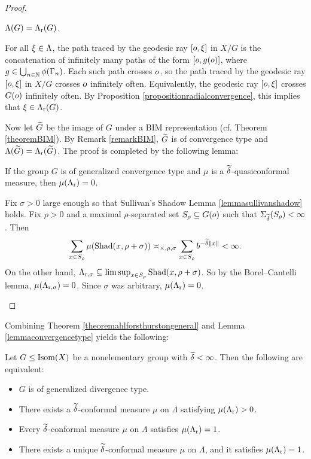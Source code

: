 \begin{proof}
\begin{subproof}
\end{subproof}
\begin{claim}
$\Lambda(G) = \Lambda_{\mathrm r}(G)$.
\end{claim}
\begin{subproof}
For all $\xi\in\Lambda$, the path traced by the geodesic ray $[o,\xi]$ in $X/G$ is the concatenation of infinitely many paths of the form $[o,g(o)]$, where $g\in \bigcup_{n\in\N}\phi(\Gamma_n)$. Each such path crosses $o$, so the path traced by the geodesic ray $[o,\xi]$ in $X/G$ crosses $o$ infinitely often. Equivalently, the geodesic ray $[o,\xi]$ crosses $G(o)$ infinitely often. By Proposition \ref{propositionradialconvergence}, this implies that $\xi\in\Lambda_{\mathrm r}(G)$.
\end{subproof}

Now let $\widetilde G$ be the image of $G$ under a BIM representation (cf. Theorem \ref{theoremBIM}). By Remark \ref{remarkBIM}, $\widetilde G$ is of convergence type and $\Lambda(\widetilde G) = \Lambda_{\mathrm r}(\widetilde G)$. The proof is completed by the following lemma:

\begin{lemma}
\label{lemmaconvergencetype}
If the group $G$ is of generalized convergence type and $\mu$ is a $\widetilde\delta$-quasiconformal measure, then $\mu(\Lambda_{\mathrm r}) = 0$.
\end{lemma}
\begin{subproof}
Fix $\sigma > 0$ large enough so that Sullivan's Shadow Lemma \ref{lemmasullivanshadow} holds. Fix $\rho > 0$ and a maximal $\rho$-separated set $S_\rho\subseteq G(o)$ such that $\Sigma_{\widetilde\delta}(S_\rho) < \infty$. Then
\[
\sum_{x\in S_\rho} \mu(\operatorname{Shad}(x,\rho + \sigma)) \asymp_{\times,\rho,\sigma} \sum_{x\in S_\rho} b^{-\widetilde\delta\|x\|} < \infty.
\]
On the other hand, $\Lambda_{\mathrm r,\sigma}\subseteq\limsup_{x\in S_\rho} \operatorname{Shad}(x,\rho + \sigma)$. So by the Borel--Cantelli lemma, $\mu(\Lambda_{\mathrm r,\sigma}) = 0$. Since $\sigma$ was arbitrary, $\mu(\Lambda_{\mathrm r}) = 0$.
\end{subproof}
\end{proof}


Combining Theorem \ref{theoremahlforsthurstongeneral} and Lemma \ref{lemmaconvergencetype} yields the following:

\begin{proposition}
\label{propositiondivtypedichotomy}
Let $G\leq\operatorname{Isom}(X)$ be a nonelementary group with $\widetilde\delta < \infty$. Then the following are equivalent:
\begin{itemize}
\item[(A)] $G$ is of generalized divergence type.
\item[(B)] There exists a $\widetilde\delta$-conformal measure $\mu$ on $\Lambda$ satisfying $\mu(\Lambda_{\mathrm r}) > 0$.
\item[(C)] Every $\widetilde\delta$-conformal measure $\mu$ on $\Lambda$ satisfies $\mu(\Lambda_{\mathrm r}) = 1$.
\item[(D)] There exists a unique $\widetilde\delta$-conformal measure $\mu$ on $\Lambda$, and it satisfies $\mu(\Lambda_{\mathrm r}) = 1$.
\end{itemize}
\end{proposition}

